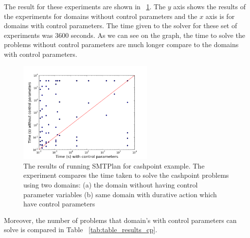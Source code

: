 The result for these experiments are shown in ~\ref{fig:CP_results}. The $y$ axis shows the results of the experiments for domains without control parameters and the $x$ axis is for domains with control parameters. The time given to the solver for these set of experiments was 3600 seconds. As we can see on the graph, the time to solve the problems without control parameters are much longer compare to the domains with control parameters. 

\begin{figure}[!ht]
\centering
\includegraphics[width=0.60\textwidth]{diagrams/CP_results.png}
\caption{The results of running SMTPlan for cashpoint example. The experiment compares the time taken to solve the cashpoint problems using two domains: (a) the domain without having control parameter variables (b) same domain with durative action which have control parameters}
\label{fig:CP_results}
\end{figure}


Moreover, the number of problems that domain's with control parameters can solve is compared in Table ~\ref{tab:table_results_cp}.

